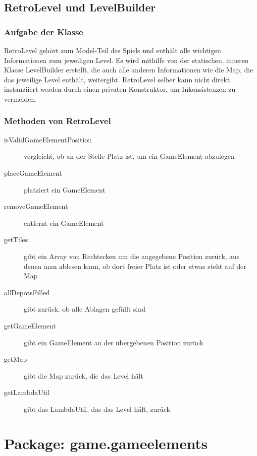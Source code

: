 \documentclass[parskip=full]{scrreprt}
\begin{document}
\subsection{RetroLevel und LevelBuilder}

\subsubsection{Aufgabe der Klasse}

\begin{description}
	\item RetroLevel gehört zum Model-Teil des Spiels und enthält alle wichtigen Informationen zum jeweiligen Level. Es wird mithilfe von der statischen, inneren Klasse LevelBuilder erstellt, die auch alle anderen Informationen wie die Map, die das jeweilige Level enthält, weitergibt. RetroLevel selber kann nicht direkt instanziiert werden durch einen privaten Konstruktor, um Inkonsistenzen zu vermeiden.
\end{description}

\subsubsection{Methoden von RetroLevel}

\begin{description}
	
	\item[isValidGameElementPosition] vergleicht, ob an der Stelle Platz ist, um ein GameElement abzulegen
	\item[placeGameElement] platziert ein GameElement
	\item[removeGameElement] entfernt ein GameElement
	\item[getTiles] gibt ein Array von Rechtecken um die angegebene Position zurück, aus denen man ablesen kann, ob dort freier Platz ist oder etwas steht auf der Map
	\item[allDepotsFilled] gibt zurück, ob alle Ablagen gefüllt sind
	\item[getGameElement] gibt ein GameElement an der übergebenen Position zurück
	\item[getMap] gibt die Map zurück, die das Level hält
	\item[getLambdaUtil] gibt das LambdaUtil, das das Level hält, zurück
	
\end{description}

\section{Package: game.gameelements}
\end{document}
